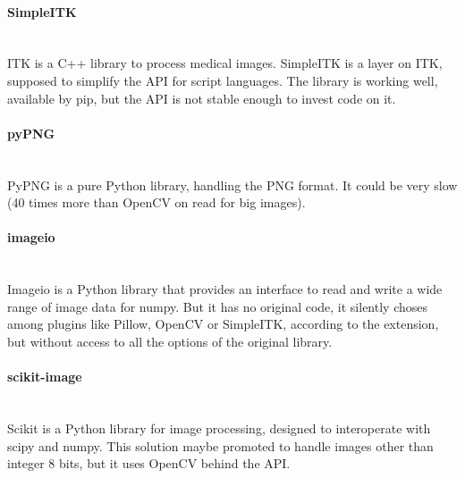\paragraph{SimpleITK} \hspace{0pt} \\
ITK is a C++ library to process medical images. SimpleITK is a layer on ITK, supposed to simplify the API for script languages. The library is working well, available by pip, but the API is not stable enough to invest code on it.

\paragraph{pyPNG} \hspace{0pt} \\
PyPNG is a pure Python library, handling the PNG format. It could be very slow (40 times more than OpenCV on read for big images). 

\paragraph{imageio} \hspace{0pt} \\
Imageio is a Python library that provides an interface to read and write a wide range of image data for numpy. But it has no original code, it silently choses among plugins like Pillow, OpenCV or SimpleITK, according to the extension, but without access to all the options of the original library.

\paragraph{scikit-image} \hspace{0pt} \\
Scikit is a Python library for image processing, designed to interoperate with scipy and numpy. This solution maybe promoted to handle images other than integer 8 bits, but it uses OpenCV behind the API.



